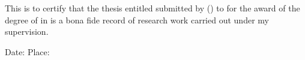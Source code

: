 
This is to certify that the thesis entitled \textbf{} submitted by
\textbf{\ThesisAuthorName} (\textbf{\ThesisRollNumber}) to \textbf{\ThesisInstitute} for the award of the
degree of \textbf{\ThesisDegree} in \textbf{\ThesisProgram} is a bona fide record of research work carried
out under my supervision.

\vspace{3cm}
\begin{flushright}
\SignatureBlock[0.34\textwidth]{%
\textbf{\ThesisSupervisorName}\\
\ThesisSupervisorDesignation\\
\ThesisSupervisorDepartment\\
\ThesisInstitute
}
\end{flushright}

\vfill
\noindent Date: \ThesisApprovalDate \hfill Place: \ThesisPlace
\clearpage
